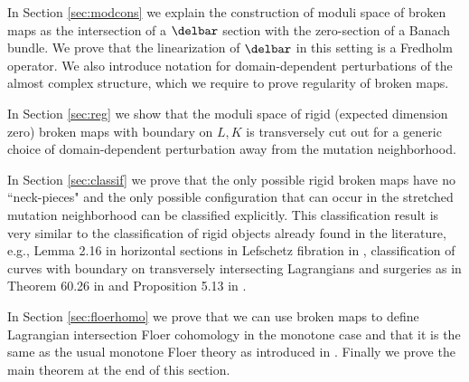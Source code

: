  In Section \ref{sec:modcons} we explain the construction of moduli space of broken maps as the intersection of a $\delbar$ section with the zero-section of a Banach bundle.  We prove that the linearization of $\delbar$ in this setting is a Fredholm operator.  We also introduce notation for domain-dependent perturbations of the almost complex structure, which we require to prove regularity of broken maps.  
 
 In Section \ref{sec:reg} we show that the moduli space of rigid (expected dimension zero)  broken maps with boundary on $L, K$ is transversely cut out for a generic choice of domain-dependent perturbation away from the mutation neighborhood.  
 
 In Section \ref{sec:classif} we prove that the only possible rigid broken maps have no ``neck-pieces" and the only possible configuration that can occur in the stretched mutation neighborhood can be classified explicitly.  This classification result is very similar to the classification of rigid objects already found in the literature, e.g.,  Lemma 2.16 in horizontal sections in Lefschetz fibration in \cite{seidelLongEx},  classification of curves with boundary on transversely intersecting Lagrangians and surgeries as in Theorem 60.26 in \cite{ch10} and Proposition 5.13 in \cite{palmerwoodwardsurg}. 
 
 
 
In Section \ref{sec:floerhomo} we prove that we can use broken maps to define Lagrangian intersection Floer cohomology in the monotone case and that it is the same as the usual monotone Floer theory as introduced in \cite{ohMonotone}.  Finally  we prove  the main theorem at the end of this section. 
 
 


 